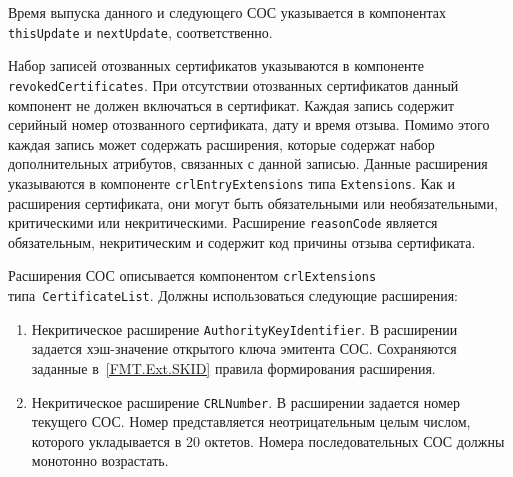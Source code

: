 Время выпуска данного и следующего СОС указывается в 
компонентах \texttt{thisUpdate} и \texttt{nextUpdate}, 
соответственно.

Набор записей отозванных сертификатов указываются в компоненте 
\texttt{revokedCertificates}. При отсутствии отозванных  
сертификатов данный компонент не должен включаться в сертификат.
Каждая запись содержит серийный номер отозванного 
сертификата, дату и время отзыва. Помимо этого
каждая запись может содержать расширения, которые содержат
набор дополнительных атрибутов, связанных с данной записью. 
Данные расширения указываются в компоненте 
\texttt{crlEntryExtensions} типа \texttt{Extensions}. Как 
и расширения сертификата, они могут быть обязательными или необязательными,
критическими или некритическими. Расширение \texttt{reasonCode}
является обязательным, некритическим и содержит код причины 
отзыва сертификата.  



Расширения СОС описывается компонентом \texttt{crlExtensions}
типа~\texttt{CertificateList}. Должны использоваться следующие расширения: 
\begin{enumerate}
\item 
Некритическое расширение \texttt{AuthorityKeyIdentifier}. 
В расширении задается хэш-значение открытого ключа эмитента СОС.
Сохраняются заданные в~\ref{FMT.Ext.SKID} правила формирования 
расширения.

\item
Некритическое расширение \texttt{CRLNumber}. 
В расширении задается номер текущего СОС.
Номер представляется неотрицательным целым числом, 
 которого укладывается в 20 октетов. 
Номера последовательных СОС должны монотонно возрастать.
\end{enumerate}

